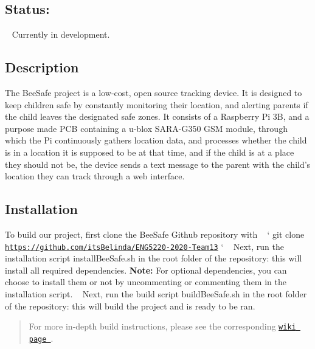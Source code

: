 \subsection*{Status\+:}

\href{https://travis-ci.com/itsBelinda/ENG5220-2020-Team13}{\tt } \href{https://codecov.io/gh/itsBelinda/ENG5220-2020-Team13}{\tt } ~\newline
Currently in development.

\subsection*{Description}

The Bee\+Safe project is a low-\/cost, open source tracking device. It is designed to keep children safe by constantly monitoring their location, and alerting parents if the child leaves the designated safe zones. It consists of a Raspberry Pi 3B, and a purpose made P\+CB containing a u-\/blox S\+A\+R\+A-\/\+G350 G\+SM module, through which the Pi continuously gathers location data, and processes whether the child is in a location it is supposed to be at that time, and if the child is at a place they should not be, the device sends a text message to the parent with the child’s location they can track through a web interface.

\subsection*{Installation}

To build our project, first clone the Bee\+Safe Github repository with ~\newline
 ` git clone \href{https://github.com/itsBelinda/ENG5220-2020-Team13}{\tt https\+://github.\+com/its\+Belinda/\+E\+N\+G5220-\/2020-\/\+Team13} ` ~\newline
 Next, run the installation script {\ttfamily install\+Bee\+Safe.\+sh} in the root folder of the repository\+: this will install all required dependencies. {\bfseries Note\+:} For optional dependencies, you can choose to install them or not by uncommenting or commenting them in the installation script. ~\newline
 Next, run the build script {\ttfamily build\+Bee\+Safe.\+sh} in the root folder of the repository\+: this will build the project and is ready to be ran. \begin{quote}
For more in-\/depth build instructions, please see the corresponding \href{https://github.com/itsBelinda/ENG5220-2020-Team13/wiki/Build-Guide}{\tt wiki page }. \end{quote}



